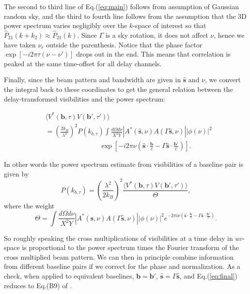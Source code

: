 \documentclass[twocolumn,apj,numberedappendix]{emulateapj}
\renewcommand\[{\begin{equation}}
\renewcommand\]{\end{equation}}
\begin{document}
The second to third line of Eq.(\ref{eq:main}) follows from assumption of Gaussian random
sky, and the third to fourth line follows from the assumption that
the 3D power spectrum varies negligibly over the $k$-space of interest
so that $\hat{P}_{21}(k+k_{2})\approx\hat{P}_{21}(k)$. Since $\Gamma$
is a sky rotation, it does not affect $\nu$, hence we have taken $\nu_{r}$
outside the parenthesis. Notice that the phase factor $\exp\left[-i2\pi\tau\left(\nu-\nu'\right)\right]$
drops out in the end. This means that correlation is peaked at the same time-offset for all delay channels. 

Finally, since the beam pattern and bandwidth are given in $\hat{\boldsymbol{s}}$
and $\nu$, we convert the integral back to these coordinates to get
the general relation between the delay-transformed visibilities and
the power spectrum:

\begin{equation}
\begin{aligned} & \langle V^{*}(\boldsymbol{b},\tau)V(\boldsymbol{b'},\tau')\rangle\\
 & =\left(\frac{2k_{B}}{\lambda^{2}}\right)^{2}P(k_{b,\tau})\int\frac{d\Omega d\nu}{X^{2}Y}|A^{*}(\hat{\boldsymbol{s}},\nu)A(\Gamma\hat{\boldsymbol{s}},\nu)||\phi(\nu)|^{2}\\
 & \qquad \qquad \qquad \qquad \exp\left[-i2\pi\nu\left(\hat{\boldsymbol{s}}\cdot\frac{\boldsymbol{b}}{c}-\Gamma\hat{\boldsymbol{s}}\cdot\frac{\boldsymbol{b'}}{c}\right)\right].\end{aligned}
\label{eq:final}
\end{equation}

In other words the power spectrum estimate from visibilities of a baseline pair is given by 
\begin{equation}
 P(k_{b,\tau}) = \left(\frac{\lambda^{2}}{2k_{B}}\right)^{2} \frac{\langle V^{*}(\boldsymbol{b},\tau)V(\boldsymbol{b'},\tau')\rangle}{\Theta}, 
 \label{eq:opp}
\end{equation}
where the weight
\begin{equation}
\Theta =\int\frac{d\Omega d\nu}{X^{2}Y}|A^{*}(\hat{\boldsymbol{s}},\nu)A(\Gamma\hat{\boldsymbol{s}},\nu)||\phi(\nu)|^{2} e^{-2\pi i\nu\left(\hat{\boldsymbol{s}}\cdot\frac{\boldsymbol{b}}{c}-\Gamma\hat{\boldsymbol{s}}\cdot\frac{\boldsymbol{b'}}{c}\right)}. 
\label{eq:Theta}
\end{equation}



So roughly speaking the cross multiplications of visibilities at a time delay
in $uv$-space is proportional to the power spectrum times the Fourier
transform of the cross multiplied beam pattern. We can then in principle
combine information from different baseline pairs if we correct for
the phase and normalization. As a check, when applied to equivalent baselines,
$\boldsymbol{b}=\boldsymbol{b'}$, $\hat{\boldsymbol{s}}=\Gamma\hat{\boldsymbol{s}}$, and Eq.(\ref{eq:final}) reduces to Eq.(B9) of \cite{paper32}. 
\end{document}
